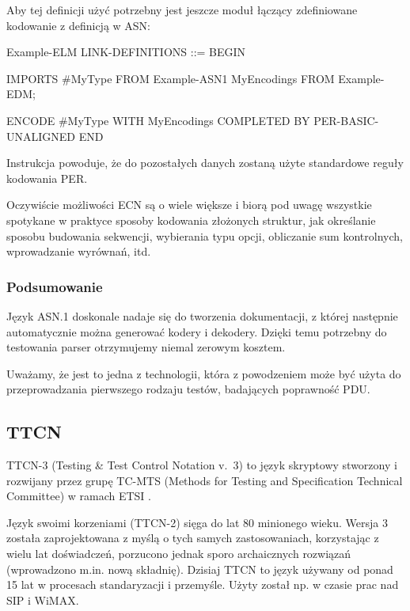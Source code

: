 \documentclass[00-praca-magisterska.tex]{subfiles}
\begin{document}
Aby tej definicji użyć potrzebny jest jeszcze moduł łączący zdefiniowane kodowanie z definicją w ASN:

\begin{textcode}
  Example-ELM LINK-DEFINITIONS ::=
  BEGIN
  
  IMPORTS
    #MyType
  FROM Example-ASN1
    MyEncodings
  FROM Example-EDM;
  
  ENCODE #MyType
    WITH          MyEncodings
    COMPLETED BY  PER-BASIC-UNALIGNED
  END
\end{textcode}

Instrukcja  powoduje, że do pozostałych danych zostaną użyte
standardowe reguły kodowania PER.

Oczywiście możliwości ECN są o wiele większe i biorą pod uwagę wszystkie
spotykane w praktyce sposoby kodowania złożonych struktur, jak określanie
sposobu budowania sekwencji, wybierania typu opcji, obliczanie sum kontrolnych,
wprowadzanie wyrównań, itd.

\subsubsection{Podsumowanie}

Język ASN.1 doskonale nadaje się do tworzenia dokumentacji, z której następnie
automatycznie można generować kodery i dekodery. Dzięki temu potrzebny do
testowania parser otrzymujemy niemal zerowym kosztem.

Uważamy, że jest to jedna z technologii, która z powodzeniem może być użyta do
przeprowadzania pierwszego rodzaju testów, badających poprawność PDU.

\subsection{TTCN}
\label{ttcn}

TTCN-3 (Testing \& Test Control Notation v.~3) to język skryptowy stworzony i
rozwijany przez grupę TC-MTS (Methods for Testing and Specification Technical
Committee) w ramach ETSI \cite{ttcn-main}.

Język swoimi korzeniami (TTCN-2) sięga do lat 80 minionego wieku. Wersja 3
została zaprojektowana z myślą o tych samych zastosowaniach, korzystając z wielu
lat doświadczeń, porzucono jednak sporo archaicznych rozwiązań (wprowadzono
m.in. nową składnię). Dzisiaj TTCN to język używany od ponad 15 lat w procesach
standaryzacji i przemyśle. Użyty został np. w czasie prac nad SIP i WiMAX.
\end{document}
